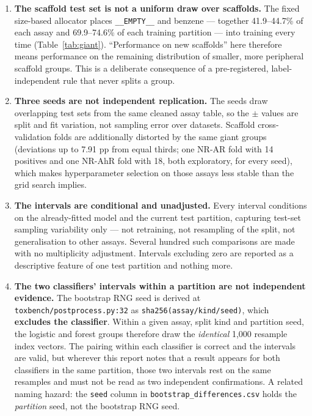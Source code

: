 \documentclass[10pt,letterpaper]{article}
\newcommand{\pmx}{$\pm$}
\begin{document}
\begin{enumerate}\setlength{\itemsep}{1pt}
\item \textbf{The scaffold test set is not a uniform draw over scaffolds.} The fixed size-based
allocator places \texttt{\_\_EMPTY\_\_} and benzene --- together 41.9--44.7\% of each assay and
69.9--74.6\% of each training partition --- into training every time (Table~\ref{tab:giant}).
``Performance on new scaffolds'' here therefore means performance on the remaining distribution of
smaller, more peripheral scaffold groups. This is a deliberate consequence of a pre-registered,
label-independent rule that never splits a group.

\item \textbf{Three seeds are not independent replication.} The seeds draw overlapping test sets from
the same cleaned assay table, so the \pmx{} values are split and fit variation, not sampling error
over datasets. Scaffold cross-validation folds are additionally distorted by the same giant groups
(deviations up to 7.91 pp from equal thirds; one NR-AR fold with 14 positives and one NR-AhR fold
with 18, both exploratory, for every seed), which makes hyperparameter selection on those assays less
stable than the grid search implies.

\item \textbf{The intervals are conditional and unadjusted.} Every interval conditions on the
already-fitted model and the current test partition, capturing test-set sampling variability only ---
not retraining, not resampling of the split, not generalisation to other assays. Several hundred such
comparisons are made with no multiplicity adjustment. Intervals excluding zero are reported as a
descriptive feature of one test partition and nothing more.

\item \textbf{The two classifiers' intervals within a partition are not independent evidence.} The
bootstrap RNG seed is derived at \texttt{toxbench/postprocess.py:32} as
\texttt{sha256(assay/kind/seed)}, which \textbf{excludes the classifier}. Within a given assay, split
kind and partition seed, the logistic and forest groups therefore draw the \emph{identical} 1{,}000
resample index vectors. The pairing within each classifier is correct and the intervals are valid,
but wherever this report notes that a result appears for both classifiers in the same partition,
those two intervals rest on the same resamples and must not be read as two independent
confirmations. A related naming hazard: the \texttt{seed} column in
\texttt{bootstrap\_differences.csv} holds the \emph{partition} seed, not the bootstrap RNG seed.


\end{enumerate}
\end{document}
